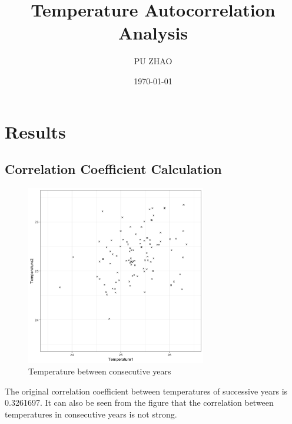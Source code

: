 \documentclass[a4paper,12pt]{article}
\title{Temperature Autocorrelation Analysis}
\author{PU ZHAO}
\date{\today}
\begin{document}
\maketitle
\section{Results}

\subsection{Correlation Coefficient Calculation}
  \begin{figure}[ht]
    \centering
    \includegraphics[width=0.7\textwidth]{../data/ats_plot.png}
    \caption{Temperature between consecutive years}
  \end{figure}
  The original correlation coefficient between temperatures of successive years is 0.3261697. It can also be seen from the figure that the correlation between temperatures in consecutive years is not strong.
\end{document}
